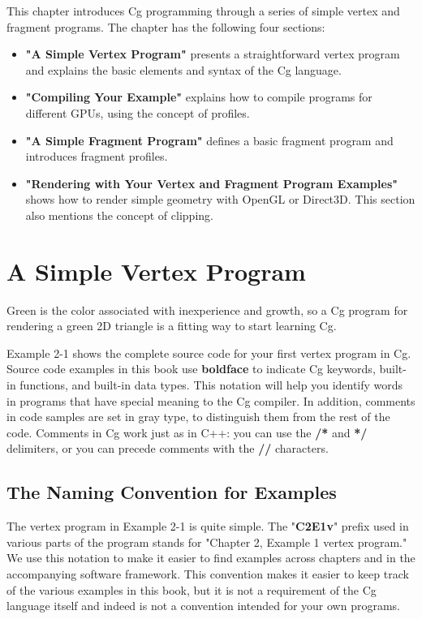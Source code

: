 \documentclass{book}
\begin{document}
This chapter introduces Cg programming through a series of simple vertex and fragment programs. The chapter has the following four sections:

\FloatBarrier
\begin{itemize}
    \item \textbf{"A Simple Vertex Program"} presents a straightforward vertex program and explains the basic elements and syntax of the Cg language.
    \item \textbf{"Compiling Your Example"} explains how to compile programs for different GPUs, using the concept of profiles.
    \item \textbf{"A Simple Fragment Program"} defines a basic fragment program and introduces fragment profiles.
    \item \textbf{"Rendering with Your Vertex and Fragment Program Examples"} shows how to render simple geometry with OpenGL or Direct3D. This section also mentions the concept of clipping.
\end{itemize}
\FloatBarrier

\section{A Simple Vertex Program}

Green is the color associated with inexperience and growth, so a Cg program for rendering a green 2D triangle is a fitting way to start learning Cg.

Example 2-1 shows the complete source code for your first vertex program in Cg. Source code examples in this book use \textbf{boldface} to indicate Cg keywords, built-in functions, and built-in data types. This notation will help you identify words in programs that have special meaning to the Cg compiler. In addition, comments in code samples are set in gray type, to distinguish them from the rest of the code. Comments in Cg work just as in C++: you can use the \textbf{/*} and \textbf{*/} delimiters, or you can precede comments with the \textbf{//} characters.

\subsection*{The Naming Convention for Examples}

The vertex program in Example 2-1 is quite simple. The "\textbf{C2E1v}" prefix used in various parts of the program stands for "Chapter 2, Example 1 vertex program." We use this notation to make it easier to find examples across chapters and in the accompanying software framework. This convention makes it easier to keep track of the various examples in this book, but it is not a requirement of the Cg language itself and indeed is not a convention intended for your own programs.
\end{document}
